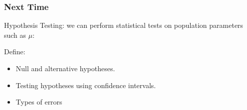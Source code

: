 \documentclass[handout]{beamer}
\newcommand{\blue}[1]{\textcolor{blue2}{#1}}
\begin{document}
\begin{frame}[fragile]
\frametitle{Next Time}

Hypothesis Testing:  we can perform \blue{statistical tests} on population parameters such as $\mu$:

\vspace{0.5cm}

Define:
\begin{itemize}
\item Null and alternative hypotheses.
\item Testing hypotheses using confidence intervals.
\item Types of errors
\end{itemize}

\end{frame}
\end{document}
